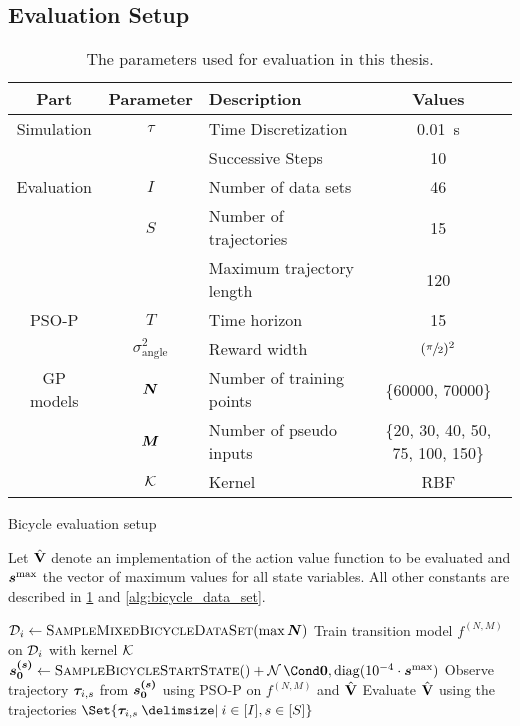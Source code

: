 \subsection{Evaluation Setup}
\begin{table}[t]
    \centering
    \caption{The parameters used for evaluation in this thesis.}
    \label{tab:evaluation_parameters}
    \begin{tabularx}{\tablewidth}{ccXc}
        \toprule
        Part & Parameter & Description & Values \\
        \midrule
        Simulation & $\tau$ & Time Discretization & \SI[mode=text]{0.01}{\second} \\
        & & Successive Steps & 10 \\
        \addlinespace
        Evaluation & $I$ & Number of data sets & 46 \\
        & $S$ & Number of trajectories & 15 \\
        & & Maximum trajectory length & 120 \\
        \addlinespace
        PSO-P & $T$ & Time horizon & 15 \\
        & $\sigma_{\text{angle}}^2$ & Reward width & $(\sfrac{\pi}{2})^2$ \\
        \addlinespace
        GP models & $\bm{N}$ & Number of training points & \{60000, 70000\} \\
        & $\bm{M}$ & Number of pseudo inputs & \{20, 30, 40, 50, 75, 100, 150\} \\
        & $\operatorname{\mathcal{K}}$ & Kernel & RBF \\
        \bottomrule
    \end{tabularx}
\end{table}
\begin{algorithm}[tp]
    \caption{Bicycle evaluation setup}
    \label{alg:evaluation_setup}
    Let $\operatorname{\hat{\operatorname{\mathbf{V}}}}$ denote an implementation of the action value function to be evaluated and $\bm{s}^{\text{max}}$ the vector of maximum values for all state variables.
    All other constants are described in \cref{tab:evaluation_parameters} and \cref{alg:bicycle_data_set}.
    \begin{algorithmic}[1]
            \State $\D_i \gets \Call{SampleMixedBicycleDataSet}{\max \mat{N}}$
                \State Train transition model $f^{(N, M)}$ on $\mathcal{D}_i$ with kernel $\operatorname{\mathcal{K}}$
                \State $\mat{s^{(s)}_0} \gets \Call{SampleBicycleStartState}{\null} + \Gaussian{\mat{0}, \diag(10^{-4} \cdot \mat{s}^{\text{max}})}$
                    \State Observe trajectory $\bm{\tau}_{i, s}$ from $\bm{s^{(s)}_0}$ using PSO-P on $f^{(N, M)}$ and $\operatorname{\hat{\operatorname{\mathbf{V}}}}$
                \EndFor
            \EndFor
        \EndFor
        \State Evaluate $\operatorname{\hat{\operatorname{\mathbf{V}}}}$ using the trajectories $\Set{\Trajectory_{i, s} \with i \in [I], s \in [S]}$
    \end{algorithmic}
\end{algorithm}
